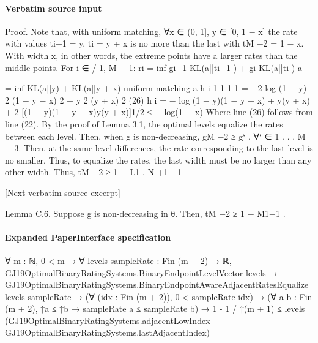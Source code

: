 \documentclass[10pt]{article}
\begin{document}
\paragraph{Verbatim source input}
\begin{ReviewVerbatim}
Proof. Note that, with uniform matching, ∀x ∈ (0, 1], y ∈ [0, 1 − x] the rate with values ti−1 =
y, ti = y + x is no more than the last with tM −2 = 1 − x. With width x, in other words, the extreme
points have a larger rates than the middle points. For i ∈
/ {1, M − 1}:
ri = inf {gi−1 KL(a||ti−1 ) + gi KL(a||ti )}
a

= inf {KL(a||y) + KL(a||y + x)}
uniform matching
a
h
i
1
1
1
1
= −2 log (1 − y) 2 (1 − y − x) 2 + y 2 (y + x) 2
(26)
h
i
= − log (1 − y)(1 − y − x) + y(y + x) + 2 [(1 − y)(1 − y − x)y(y + x)]1/2
≤ − log(1 − x)
Where line (26) follows from line (22).
By the proof of Lemma 3.1, the optimal levels equalize the rates between each level. Then,
when g is non-decreasing, gM −2 ≥ g` , ∀` ∈ {1 . . . M − 3}. Then, at the same level differences, the
rate corresponding to the last level is no smaller. Thus, to equalize the rates, the last width must
be no larger than any other width. Thus, tM −2 ≥ 1 − L1 .
N +1 −1


[Next verbatim source excerpt]

Lemma C.6. Suppose g is non-decreasing in θ. Then, tM −2 ≥ 1 − M1−1 .
\end{ReviewVerbatim}



\paragraph{Expanded PaperInterface specification}
\begin{ReviewVerbatim}
∀ {m : ℕ},
  0 < m →
    ∀ {levels sampleRate : Fin (m + 2) → ℝ},
      GJ19OptimalBinaryRatingSystems.BinaryEndpointLevelVector levels →
        GJ19OptimalBinaryRatingSystems.BinaryEndpointAwareAdjacentRatesEqualize levels sampleRate →
          (∀ (idx : Fin (m + 2)), 0 < sampleRate idx) →
            (∀ {a b : Fin (m + 2)}, ↑a ≤ ↑b → sampleRate a ≤ sampleRate b) →
              1 - 1 / ↑(m + 1) ≤
                levels
                  (GJ19OptimalBinaryRatingSystems.adjacentLowIndex GJ19OptimalBinaryRatingSystems.lastAdjacentIndex)
\end{ReviewVerbatim}
\end{document}
